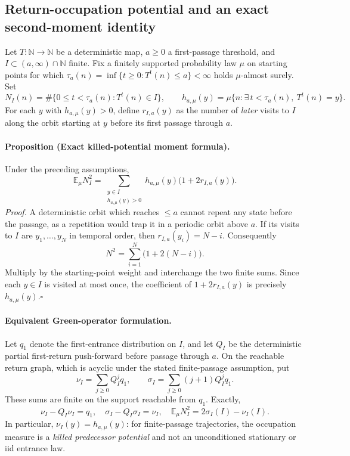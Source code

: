 \subsection*{Return-occupation potential and an exact second-moment identity}
Let $T:\mathbb N\to\mathbb N$ be a deterministic map, $a\ge0$ a
first-passage threshold, and $I\subset(a,\infty)\cap\mathbb N$ finite.
Fix a finitely supported probability law $\mu$ on starting points for which
$\tau_a(n)=\inf\{t\ge0:T^t(n)\le a\}<\infty$ holds $\mu$-almost surely.
Set
\[
  N_I(n)=\#\{0\le t<\tau_a(n):T^t(n)\in I\},\qquad
  h_{a,\mu}(y)=\mu\{n:\exists\,t<\tau_a(n),\ T^t(n)=y\}.
\]
For each $y$ with $h_{a,\mu}(y)>0$, define $r_{I,a}(y)$ as the number of
\emph{later} visits to $I$ along the orbit starting at $y$ before its
first passage through $a$.

\paragraph{Proposition (Exact killed-potential moment formula).}
Under the preceding assumptions,
\begin{equation}\label{eq:killed-return-moment}
  \boxed{\displaystyle
  \mathbb E_\mu N_I^2
     =\sum_{\substack{y\in I\\ h_{a,\mu}(y)>0}}
       h_{a,\mu}(y)\bigl(1+2r_{I,a}(y)\bigr).}
\end{equation}
\emph{Proof.} A deterministic orbit which reaches $\le a$ cannot repeat
any state before the passage, as a repetition would trap it in a periodic
orbit above $a$. If its visits to $I$ are $y_1,\ldots,y_N$ in temporal
order, then $r_{I,a}(y_i)=N-i$. Consequently
\[
  N^2=\sum_{i=1}^{N}\bigl(1+2(N-i)\bigr).
\]
Multiply by the starting-point weight and interchange the two finite
sums. Since each $y\in I$ is visited at most once, the coefficient of
$1+2r_{I,a}(y)$ is precisely $h_{a,\mu}(y)$.\hfill$\square$

\paragraph{Equivalent Green-operator formulation.}
Let $q_1$ denote the first-entrance distribution on $I$, and let $Q_I$
be the deterministic partial first-return push-forward before passage
through $a$. On the reachable return graph, which is acyclic under the
stated finite-passage assumption, put
\[
  \nu_I=\sum_{j\ge0}Q_I^j q_1,\qquad
  \sigma_I=\sum_{j\ge0}(j+1)Q_I^j q_1.
\]
These sums are finite on the support reachable from $q_1$. Exactly,
\begin{equation}\label{eq:double-green}
 \boxed{\displaystyle
 \nu_I-Q_I\nu_I=q_1,\quad
 \sigma_I-Q_I\sigma_I=\nu_I,\quad
 \mathbb E_\mu N_I^2=2\sigma_I(I)-\nu_I(I).}
\end{equation}
In particular, $\nu_I(y)=h_{a,\mu}(y)$: for finite-passage trajectories,
the occupation measure is a \emph{killed predecessor potential} and not
an unconditioned stationary or iid entrance law.

